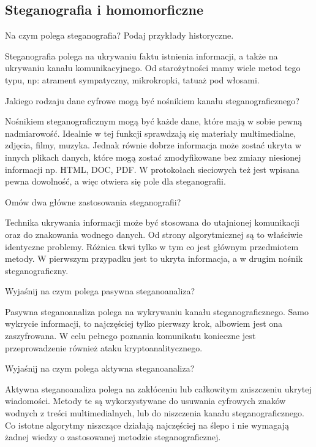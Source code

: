\documentclass[answers,11pt]{exam}
\begin{document}
\subsection{Steganografia i homomorficzne}

\begin{questions}

\question Na czym polega steganografia? Podaj przykłady historyczne.
\begin{solution}
Steganografia polega na ukrywaniu faktu istnienia informacji, a także na ukrywaniu kanału komunikacyjnego. Od starożytności mamy wiele metod tego typu, np: atrament sympatyczny, mikrokropki, tatuaż pod włosami.
\end{solution}

\question Jakiego rodzaju dane cyfrowe mogą być nośnikiem kanału steganograficznego?
\begin{solution}
Nośnikiem steganograficznym mogą być każde dane, które mają w sobie pewną nadmiarowość. Idealnie w tej funkcji sprawdzają się materiały multimedialne, zdjęcia, filmy, muzyka. Jednak równie dobrze informacja może zostać ukryta w innych plikach danych, które mogą zostać zmodyfikowane bez zmiany niesionej informacji np. HTML, DOC, PDF. W protokołach sieciowych też jest wpisana pewna dowolność, a więc otwiera się pole dla steganografii. 
\end{solution}

\question Omów dwa główne zastosowania steganografii?
\begin{solution}
Technika ukrywania informacji może być stosowana do utajnionej komunikacji oraz do znakowania wodnego danych. Od strony algorytmicznej są to właściwie identyczne problemy. Różnica tkwi tylko w tym co jest głównym przedmiotem metody. W pierwszym przypadku jest to ukryta informacja, a w drugim nośnik steganograficzny. 
\end{solution}

\question Wyjaśnij na czym polega pasywna steganoanaliza?
\begin{solution}
Pasywna steganoanaliza polega na wykrywaniu kanału steganograficznego. Samo wykrycie informacji, to najczęściej tylko pierwszy krok, albowiem jest ona zaszyfrowana. W celu pełnego poznania komunikatu konieczne jest przeprowadzenie również ataku kryptoanalitycznego.
\end{solution}

\question Wyjaśnij na czym polega aktywna steganoanaliza?
\begin{solution}
Aktywna steganoanaliza polega na zakłóceniu lub całkowitym zniszczeniu ukrytej wiadomości. Metody te są wykorzystywane do usuwania cyfrowych znaków wodnych z treści multimedialnych, lub do niszczenia kanału steganograficznego. Co istotne algorytmy niszczące działają najczęściej na ślepo i nie wymagają żadnej wiedzy o zastosowanej metodzie steganograficznej.  
\end{solution}


\end{questions}
\end{document}
